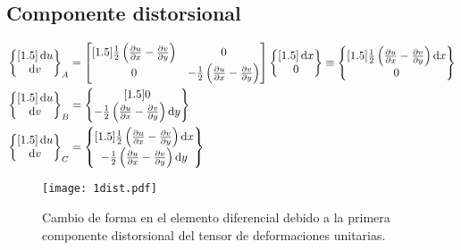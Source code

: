 \documentclass[../notas medios.tex]{subfiles}
\begin{document}
\subsection{Componente distorsional}

\begin{align*}
&\begin{Bmatrix}[1.5]
\dd{u}\\
\dd{v}
\end{Bmatrix}_A = \begin{bmatrix}[1.5]
\frac{1}{2}\left(\pdv{u}{x} - \pdv{v}{y}\right) &0\\
0 &-\frac{1}{2}\left(\pdv{u}{x} - \pdv{v}{y}\right)
\end{bmatrix} \begin{Bmatrix}[1.5]
\dd{x}\\
0
\end{Bmatrix} \equiv \begin{Bmatrix}[1.5]
\frac{1}{2}\left(\pdv{u}{x} - \pdv{v}{y}\right)\dd{x}\\
0
\end{Bmatrix}\\
&\begin{Bmatrix}[1.5]
\dd{u}\\
\dd{v}
\end{Bmatrix}_B = \begin{Bmatrix}[1.5]
0\\
-\frac{1}{2}\left(\pdv{u}{x} - \pdv{v}{y}\right) \dd{y}
\end{Bmatrix} \\
&\begin{Bmatrix}[1.5]
\dd{u}\\
\dd{v}
\end{Bmatrix}_C = \begin{Bmatrix}[1.5]
\frac{1}{2}\left(\pdv{u}{x} - \pdv{v}{y}\right) \dd{x}\\
-\frac{1}{2}\left(\pdv{u}{x} - \pdv{v}{y}\right)\dd{y}
\end{Bmatrix}
\end{align*}

\begin{figure}[H]
\centering
	\texttt{[image: 1dist.pdf]}
	\caption{Cambio de forma en el elemento diferencial debido a la primera componente distorsional del tensor de deformaciones unitarias.}
	\label{1dist}
\end{figure}
\end{document}
